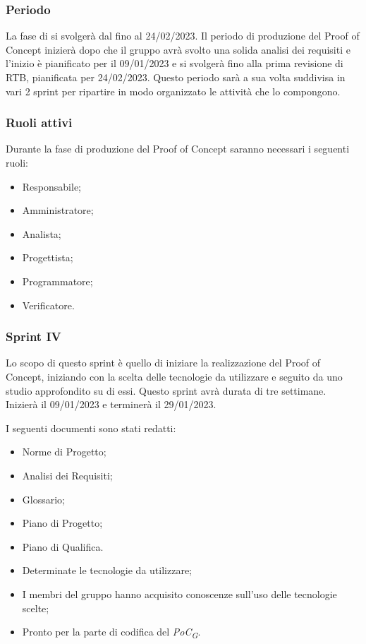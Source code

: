 \subsubsection{Periodo}
La fase di  si svolgerà dal  fino al 24/02/2023.
Il periodo di produzione del Proof of Concept inizierà dopo che il gruppo avrà svolto una solida analisi dei requisiti e l'inizio è pianificato per il 09/01/2023 e si svolgerà fino alla prima revisione di RTB, pianificata per 24/02/2023. Questo periodo sarà a sua volta suddivisa in vari 2 sprint per ripartire in modo organizzato le attività che lo compongono.

\subsubsection{Ruoli attivi}
Durante la fase di produzione del Proof of Concept saranno necessari i seguenti ruoli:
\begin{itemize}
	\item Responsabile;
    \item Amministratore;
    \item Analista;
    \item Progettista;
    \item Programmatore;
    \item Verificatore.
\end{itemize}

\subsubsection{Sprint IV}
Lo scopo di questo sprint è quello di iniziare la realizzazione del Proof of Concept, iniziando con la scelta delle tecnologie da utilizzare e seguito da uno studio approfondito su di essi.
Questo sprint avrà durata di tre settimane. Inizierà il 09/01/2023 e terminerà il 29/01/2023.

I seguenti documenti sono stati redatti:
\begin{itemize}
	\item Norme di Progetto;
	\item Analisi dei Requisiti;
	\item Glossario;
    \item Piano di Progetto;
	\item Piano di Qualifica.
\end{itemize}

\:
\begin{itemize}
	\item Determinate le tecnologie da utilizzare;
	\item I membri del gruppo hanno acquisito conoscenze sull'uso delle tecnologie scelte;
	\item Pronto per la parte di codifica del \textit{PoC\textsubscript{G}}.
\end{itemize}

